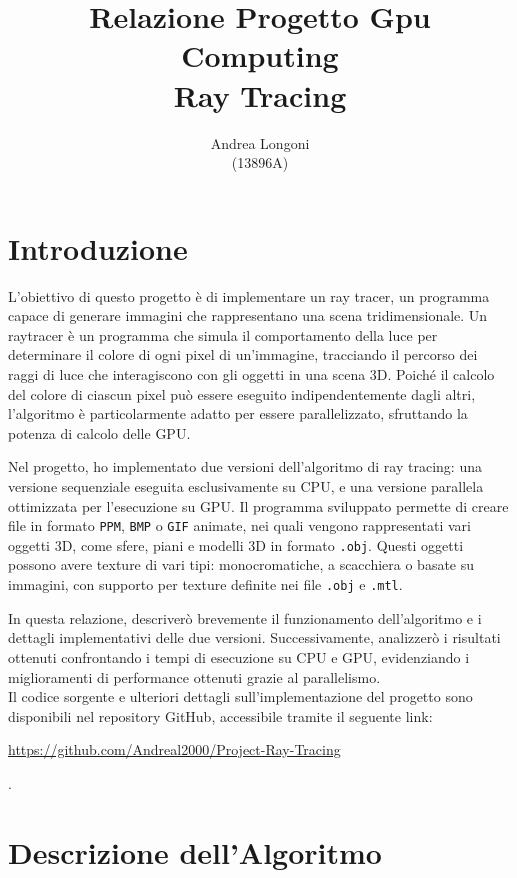 \documentclass{article}
\title{\textbf{Relazione Progetto Gpu Computing \\ \Large Ray Tracing}}
\author{Andrea Longoni\\(13896A)}
\date{}
\begin{document}
\maketitle


\section{Introduzione}

L'obiettivo di questo progetto è di implementare un ray tracer, un programma capace di generare immagini che rappresentano una scena tridimensionale.
Un raytracer è un programma che simula il comportamento della luce per determinare il colore di ogni pixel di un'immagine, tracciando il percorso dei raggi di luce che interagiscono con gli oggetti in una scena 3D.
Poiché il calcolo del colore di ciascun pixel può essere eseguito indipendentemente dagli altri, l'algoritmo è particolarmente adatto per essere parallelizzato, sfruttando la potenza di calcolo delle GPU.

Nel progetto, ho implementato due versioni dell'algoritmo di ray tracing: una versione sequenziale eseguita esclusivamente su CPU, e una versione parallela ottimizzata per l'esecuzione su GPU.
Il programma sviluppato permette di creare file in formato \texttt{PPM}, \texttt{BMP} o \texttt{GIF} animate, nei quali vengono rappresentati vari oggetti 3D, come sfere, piani e modelli 3D in formato \texttt{.obj}.
Questi oggetti possono avere texture di vari tipi: monocromatiche, a scacchiera o basate su immagini, con supporto per texture definite nei file \texttt{.obj} e \texttt{.mtl}.

In questa relazione, descriverò brevemente il funzionamento dell'algoritmo e i dettagli implementativi delle due versioni. Successivamente, analizzerò i risultati ottenuti confrontando i tempi di esecuzione su CPU e GPU, evidenziando i miglioramenti di performance ottenuti grazie al parallelismo.\\

Il codice sorgente e ulteriori dettagli sull'implementazione del progetto sono disponibili nel repository GitHub, accessibile tramite il seguente link:\\\centerline{\url{https://github.com/Andreal2000/Project-Ray-Tracing}}.

\section{Descrizione dell'Algoritmo}
\end{document}
